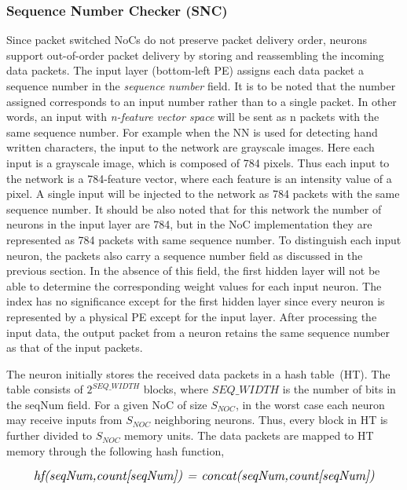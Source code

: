 \subsubsection{\bf Sequence Number Checker (SNC)}
 
Since packet switched NoCs do not preserve packet delivery order, neurons support out-of-order packet delivery by storing and reassembling the incoming data packets. 
The input layer (bottom-left PE) assigns each data packet a sequence number in the \emph{sequence number} field. 
It is to be noted that the number assigned corresponds to an input number rather than to a single packet.
In other words, an input with \emph{n-feature vector space} will be sent as n packets with the same sequence number. 
For example when the NN is used for detecting hand written characters, the input to the network are grayscale images.
Here each input is a grayscale image, which is composed of 784 pixels.
Thus each input to the network is a 784-feature vector, where each feature is an intensity value of a pixel.
A single input will be injected to the network as 784 packets with the same sequence number.
It should be also noted that for this network the number of neurons in the input layer are 784, but in the NoC implementation they are represented as 784 packets with same sequence number.
To distinguish each input neuron, the packets also carry a sequence number field as discussed in the previous section.
In the absence of this field, the first hidden layer will not be able to determine the corresponding weight values for each input neuron.
The index has no significance except for the first hidden layer since every neuron is represented by a physical PE except for the input layer.
After processing the input data, the output packet from a neuron retains the same sequence number as that of the input packets. 

The neuron initially stores the received data packets in a hash table~(HT). 
The table consists of $2^{SEQ\_WIDTH}$ blocks, where $SEQ\_WIDTH$ is the number of bits in the seqNum field. 
For a given NoC of size $S_{NOC}$, in the worst case each neuron may receive inputs from $S_{NOC}$ neighboring neurons. 
Thus, every block in HT is further divided to $S_{NOC}$ memory units. 
The data packets are mapped to HT memory through the following hash function,


\begin{equation}
\resizebox{.9\hsize}{!}{\emph{hf(seqNum,count[seqNum]) = concat(seqNum,count[seqNum])}}
\label{equation:hf}
\end{equation}

